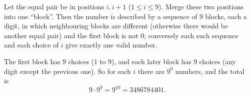 Let the equal pair be in positions $i,i+1$ ($1\le i\le9$). Merge these two positions into one ``block''. Then the number is described by a sequence of $9$ blocks, each a digit, in which neighbouring blocks are different (otherwise there would be another equal pair) and the first block is not $0$; conversely each such sequence and each choice of $i$ give exactly one valid number.

The first block has $9$ choices ($1$ to $9$), and each later block has $9$ choices (any digit except the previous one). So for each $i$ there are $9^9$ numbers, and the total is
\[
9\cdot9^9=9^{10}=\boxed{3486784401}.
\]
